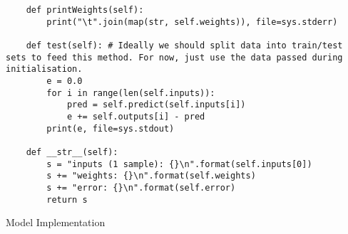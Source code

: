 \documentclass[11pt,a4paper]{article}
\begin{document}
\begin{listing}[htbp]
\begin{verbatim}
    def printWeights(self):
        print("\t".join(map(str, self.weights)), file=sys.stderr)

    def test(self): # Ideally we should split data into train/test sets to feed this method. For now, just use the data passed during initialisation.
        e = 0.0
        for i in range(len(self.inputs)):
            pred = self.predict(self.inputs[i])
            e += self.outputs[i] - pred
        print(e, file=sys.stdout)
        
    def __str__(self):
        s = "inputs (1 sample): {}\n".format(self.inputs[0])
        s += "weights: {}\n".format(self.weights)
        s += "error: {}\n".format(self.error)
        return s
\end{verbatim}
\caption{Model Implementation \label{perceptron-class}}
\end{listing}
\end{document}
